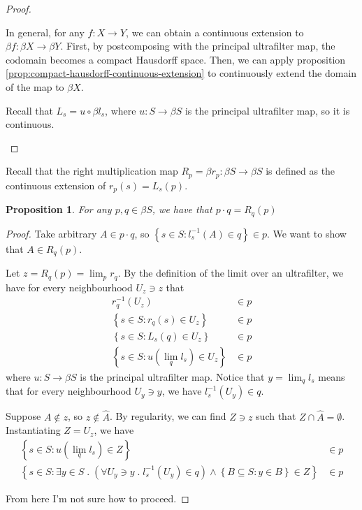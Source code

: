 \documentclass[11pt,letterpaper]{article}
\newtheorem{prop}{Proposition}
\newcommand{\inv}{^{-1}}
\newcommand{\parens}[1]{\left(#1\right)}
\newcommand{\intersn}{\cap}
\newcommand{\setof}[1]{\left\{#1\right\}}
\begin{document}
\begin{proof}
\begin{description}
            In general, for any $f : X \to Y$, we can obtain a continuous
            extension to $\beta f : \beta X \to \beta Y$. First, by
            postcomposing with the principal ultrafilter map, the codomain
            becomes a compact Hausdorff space. Then, we can apply proposition
            \ref{prop:compact-hausdorff-continuous-extension} to continuously
            extend the domain of the map to $\beta X$.

            Recall that $L_s = u \circ \beta l_s$, where $u : S \to \beta S$ is
            the principal ultrafilter map, so it is continuous.
    \end{description}
\end{proof}

Recall that the right multiplication map
$R_p = \beta r_p : \beta S \to \beta S$ is defined as the continuous extension
of $r_p(s) = L_s(p)$.

\begin{prop}
    For any $p, q \in \beta S$, we have that $p \cdot q = R_q (p)$
\end{prop}

\begin{proof}
    Take arbitrary $A \in p \cdot q$,
    so $\setof{s \in S : l_s\inv(A) \in q} \in p$.
    We want to show that $A \in R_q (p)$.

    Let $z = R_q (p) = \lim_p r_q$.
    By the definition of the limit over an ultrafilter, we have for every
    neighbourhood $U_z \ni z$ that
    \begin{align*}
        r_q\inv (U_z) &\in p \\
        \setof{s \in S : r_q(s) \in U_z} &\in p \\
        \setof{s \in S : L_s(q) \in U_z} &\in p \\
        \setof{s \in S : u(\lim_q l_s) \in U_z} &\in p
    \end{align*}
    where $u : S \to \beta S$ is the principal ultrafilter map.
    Notice that $y = \lim_q l_s$ means that for every neighbourhood
    $U_y \ni y$, we have $l_s\inv (U_y) \in q$.

    Suppose $A \notin z$, so $z \notin \hat A$.
    By regularity, we can find $Z \ni z$ such that
    $Z \intersn \hat A = \emptyset$.
    Instantiating $Z = U_z$, we have
    \begin{align*}
        \setof{s \in S : u(\lim_q l_s) \in Z} &\in p \\
        \setof{
            s \in S :
            \exists y \in S \; . \;
            \parens{
                \forall U_y \ni y \; . \;
                l_s\inv(U_y) \in q
            }
            \land
            \setof{
                B \subseteq S :
                y \in B
            }
            \in Z
        }
        &\in p
    \end{align*}

    From here I'm not sure how to proceed.
\end{proof}
\end{document}
